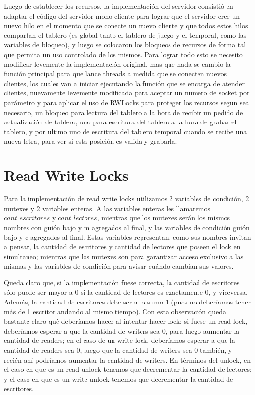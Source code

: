 \documentclass{article}
\begin{document}
Luego de establecer los recursos, la implementación del servidor consistió en adaptar el código del servidor mono-cliente para lograr que el servidor cree un nuevo hilo en el momento que se conecte un nuevo cliente y que todos estos hilos compartan el tablero (es global tanto el tablero de juego y el temporal, como las variables de bloqueo), y luego se colocaron los bloqueos de recursos de forma tal que permita un uso controlado de los mismos. Para lograr todo esto se necesito modificar levemente la implementación original, mas que nada se cambio la función principal para que lance threads a medida que se conecten nuevos clientes, los cuales van a iniciar ejecutando la función que se encarga de atender clientes, nuevamente levemente modificada para aceptar un numero de socket por parámetro y para aplicar el uso de RWLocks para proteger los recursos segun sea necesario, un bloqueo para lectura del tablero a la hora de recibir un pedido de actualización de tablero, uno para escritura del tablero a la hora de grabar el tablero, y por ultimo uno de escritura del tablero temporal cuando se recibe una nueva letra, para ver si esta posición es valida y grabarla.

\section{Read Write Locks}

Para la implementación de read write locks utilizamos 2 variables de condición, 2 mutexes y 2 variables enteras. A las variables enteras les llamaremos $cant\_escritores$ y $cant\_lectores$, mientras que los mutexes serán los mismos nombres con guión bajo y m agregados al final, y las variables de condición guión bajo y c agregados al final. Estas variables representan, como sus nombres invitan a pensar, la cantidad de escritores y cantidad de lectores que poseen el lock en simultaneo; mientras que los mutexes son para garantizar acceso exclusivo a las mismas y las variables de condición para avisar cuándo cambian sus valores.

Queda claro que, si la implementación fuese correcta, la cantidad de escritores sólo puede ser mayor a 0 si la cantidad de lectores es exactamente 0, y viceversa. Además, la cantidad de escritores debe ser a lo sumo 1 (pues no deberíamos tener más de 1 escritor andando al mismo tiempo). Con esta observación queda bastante claro qué deberíamos hacer al intentar hacer lock: si fuese un read lock, deberíamos esperar a que la cantidad de writers sea 0, para luego aumentar la cantidad de readers; en el caso de un write lock, deberíamos esperar a que la cantidad de readers sea 0, luego que la cantidad de writers sea 0 también, y recién ahí podríamos aumentar la cantidad de writers. En términos del unlock, en el caso en que es un read unlock tenemos que decrementar la cantidad de lectores; y el caso en que es un write unlock tenemos que decrementar la cantidad de escritores.
\end{document}
